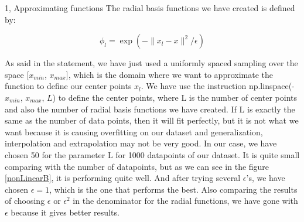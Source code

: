 \documentclass[10pt,a4paper]{article}
\begin{document}
\begin{task}{1, Approximating functions}
The radial basis functions we have created is defined by:

\begin{equation}\label{radial}
    \phi_{l} = \exp (- \| x_{l} - x \| ^ {2} / \epsilon)
\end{equation}

As said in the statement, we have just used a uniformly spaced sampling over the space [$x_{min}$, $x_{max}$], which is the domain where we want to approximate the function to define our center points $x_{l}$. We have use the instruction np.linspace(-$x_{min}$, $x_{max}$, $L$) to define the center points, where L is the number of center points and also the number of radial basis functions we have created. If L is exactly the same as the number of data points, then it will fit perfectly, but it is not what we want because it is causing overfitting on our dataset and generalization, interpolation and extrapolation may not be very good. In our case, we have chosen 50 for the parameter L for 1000 datapoints of our dataset. It is quite small comparing with the number of datapoints, but as we can see in the figure \ref{nonLinearB}, it is performing quite well. And after trying several $\epsilon$'s, we have chosen $\epsilon = 1$, which is the one that performs the best. Also comparing the results of choosing $\epsilon$ or $\epsilon^{2}$ in the denominator for the radial functions, we have gone with $\epsilon$ because it gives better results.

\end{task}

\newpage
\end{document}
